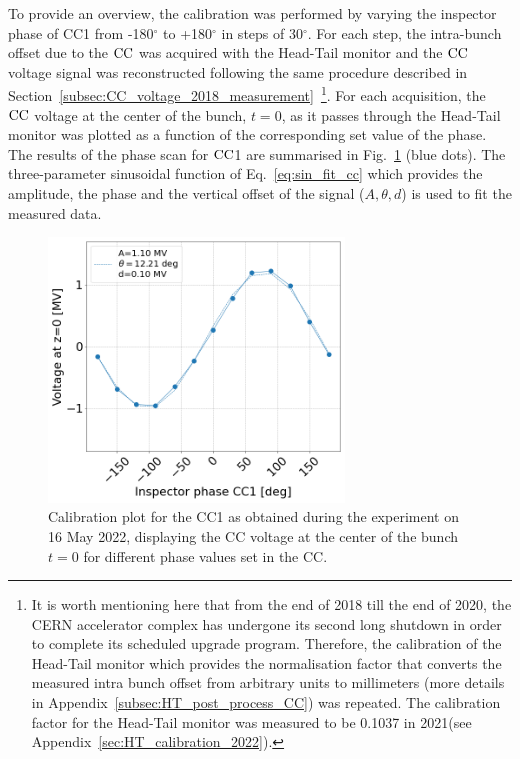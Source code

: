 To provide an overview, the calibration was performed by varying the inspector phase of CC1 from -180$^\circ$ to +180$^\circ$ in steps of 30$^\circ$. For each step, the intra-bunch offset due to the ${\mathrm{CC}}$ was acquired with the Head-Tail monitor and the ${\mathrm{CC}}$ voltage signal was reconstructed following the same procedure described in Section~\ref{subsec:CC_voltage_2018_measurement}~\footnote{It is worth mentioning here that from the end of 2018 till the end of 2020, the CERN accelerator complex has undergone its second long shutdown in order to complete its scheduled upgrade program. Therefore, the calibration of the Head-Tail monitor which provides the normalisation factor that converts the measured intra bunch offset from arbitrary units to millimeters (more details in Appendix~\ref{subsec:HT_post_process_CC}) was repeated. The calibration factor for the Head-Tail monitor was measured to be 0.1037 in 2021(see Appendix~\ref{sec:HT_calibration_2022}).}. For each acquisition, the ${\mathrm{CC}}$ voltage at the center of the bunch, $t=0$, as it passes through the Head-Tail monitor was plotted as a function of the corresponding set value of the phase. The results of the phase scan for ${\mathrm{CC}}$1 are summarised in Fig.~\ref{fig:Vcc_calibration_md_2022} (blue dots). 
The three-parameter sinusoidal function of Eq.~\eqref{eq:sin_fit_cc} which provides the amplitude, the phase and the vertical offset of the signal ($A, \theta, d$) is used to fit the measured data.



\begin{figure}[!h] %
   \centering         
   \includegraphics[width=0.7\textwidth]{images/Ch8/Vcc_at_z_zero_vs_inspector_phase_CC1_for_thesis.png}
       \caption{Calibration plot for the CC1 as obtained during the experiment on 16 May 2022, displaying the CC voltage at the center of the bunch $t=0$ for different phase values set in the CC.}
       \label{fig:Vcc_calibration_md_2022}
\end{figure}

